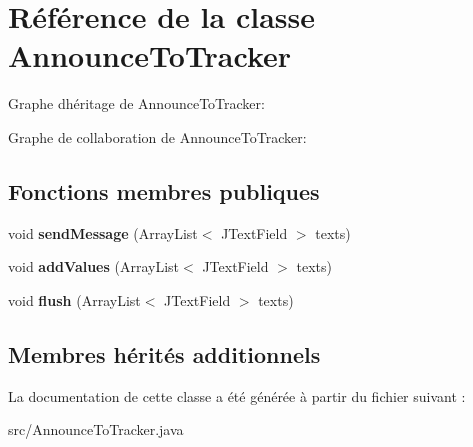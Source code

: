 \hypertarget{classAnnounceToTracker}{}\section{Référence de la classe Announce\+To\+Tracker}
\label{classAnnounceToTracker}


Graphe d\textquotesingle{}héritage de Announce\+To\+Tracker\+:


Graphe de collaboration de Announce\+To\+Tracker\+:
\subsection*{Fonctions membres publiques}
\begin{DoxyCompactItemize}
\item 
\mbox{\label{classAnnounceToTracker_aa6ef6cae088230849f935d1ce456c52a}} 
void {\bfseries send\+Message} (Array\+List$<$ J\+Text\+Field $>$ texts)
\item 
\mbox{\label{classAnnounceToTracker_ae0e5150cc163153c7c79647117140902}} 
void {\bfseries add\+Values} (Array\+List$<$ J\+Text\+Field $>$ texts)
\item 
\mbox{\label{classAnnounceToTracker_a74c67a6850ec2fe87e3259d901e07174}} 
void {\bfseries flush} (Array\+List$<$ J\+Text\+Field $>$ texts)
\end{DoxyCompactItemize}
\subsection*{Membres hérités additionnels}


La documentation de cette classe a été générée à partir du fichier suivant \+:\begin{DoxyCompactItemize}
\item 
src/Announce\+To\+Tracker.\+java\end{DoxyCompactItemize}
